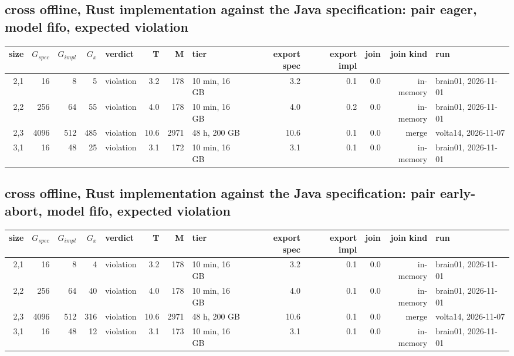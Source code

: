 \documentclass[10pt]{article}
\begin{document}
\subsection*{cross offline, Rust implementation against the Java specification: pair \textsf{eager}, model fifo, expected violation}
\begin{longtable}{@{}rrrrlrrlrrrrl@{}}
\toprule
size & $G_{\mathit{spec}}$ & $G_{\mathit{impl}}$ & $G_x$ & verdict & T & M & tier & export spec & export impl & join & join kind & run \\
\midrule
\endhead
\color{red} 2,1 & 16 & 8 & 5 & violation & 3.2 & 178 & 10 min, 16 GB & 3.2 & 0.1 & 0.0 & in-memory & brain01, 2026-11-01 \\
\color{red} 2,2 & 256 & 64 & 55 & violation & 4.0 & 178 & 10 min, 16 GB & 4.0 & 0.2 & 0.0 & in-memory & brain01, 2026-11-01 \\
\color{red} 2,3 & 4096 & 512 & 485 & violation & 10.6 & 2971 & 48 h, 200 GB & 10.6 & 0.1 & 0.0 & merge & volta14, 2026-11-07 \\
\color{red} 3,1 & 16 & 48 & 25 & violation & 3.1 & 172 & 10 min, 16 GB & 3.1 & 0.1 & 0.0 & in-memory & brain01, 2026-11-01 \\
\bottomrule
\end{longtable}
\subsection*{cross offline, Rust implementation against the Java specification: pair \textsf{early-abort}, model fifo, expected violation}
\begin{longtable}{@{}rrrrlrrlrrrrl@{}}
\toprule
size & $G_{\mathit{spec}}$ & $G_{\mathit{impl}}$ & $G_x$ & verdict & T & M & tier & export spec & export impl & join & join kind & run \\
\midrule
\endhead
\color{red} 2,1 & 16 & 8 & 4 & violation & 3.2 & 178 & 10 min, 16 GB & 3.2 & 0.1 & 0.0 & in-memory & brain01, 2026-11-01 \\
\color{red} 2,2 & 256 & 64 & 40 & violation & 4.0 & 178 & 10 min, 16 GB & 4.0 & 0.1 & 0.0 & in-memory & brain01, 2026-11-01 \\
\color{red} 2,3 & 4096 & 512 & 316 & violation & 10.6 & 2971 & 48 h, 200 GB & 10.6 & 0.1 & 0.0 & merge & volta14, 2026-11-07 \\
\color{red} 3,1 & 16 & 48 & 12 & violation & 3.1 & 173 & 10 min, 16 GB & 3.1 & 0.1 & 0.0 & in-memory & brain01, 2026-11-01 \\
\bottomrule
\end{longtable}
\end{document}
